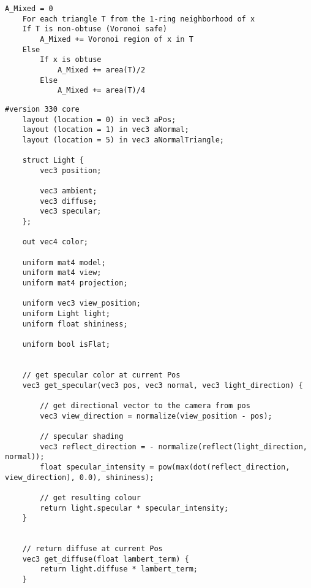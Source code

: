 \vspace{10pt}

\begin{lstlisting}[caption={Region $\mathcal{A}_{Mixed}$ on an arbitrary mesh. \cite{meshlab} (Section: \ref{section:localaveraging})\label{appendix:localaveraging}}]
    A_Mixed = 0
    For each triangle T from the 1-ring neighborhood of x
    If T is non-obtuse (Voronoi safe)
        A_Mixed += Voronoi region of x in T
    Else
        If x is obtuse
            A_Mixed += area(T)/2
        Else
            A_Mixed += area(T)/4
    \end{lstlisting}

\vspace{10pt}

\begin{lstlisting}[caption={Vertex Shader for vertex/triangle flat shading and triangle Gouraud shading using lighting (Section: \ref{section:extend-flat-shading-lighting})\label{appendix:vs-flat-shading-lighting}}]
    #version 330 core
    layout (location = 0) in vec3 aPos;
    layout (location = 1) in vec3 aNormal;
    layout (location = 5) in vec3 aNormalTriangle;

    struct Light {
        vec3 position;

        vec3 ambient;
        vec3 diffuse;
        vec3 specular;
    };

    out vec4 color;

    uniform mat4 model;
    uniform mat4 view;
    uniform mat4 projection;

    uniform vec3 view_position;
    uniform Light light;
    uniform float shininess;

    uniform bool isFlat;


    // get specular color at current Pos
    vec3 get_specular(vec3 pos, vec3 normal, vec3 light_direction) {

        // get directional vector to the camera from pos
        vec3 view_direction = normalize(view_position - pos);

        // specular shading
        vec3 reflect_direction = - normalize(reflect(light_direction, normal));
        float specular_intensity = pow(max(dot(reflect_direction, view_direction), 0.0), shininess);

        // get resulting colour
        return light.specular * specular_intensity;
    }


    // return diffuse at current Pos
    vec3 get_diffuse(float lambert_term) {
        return light.diffuse * lambert_term;
    }


\end{lstlisting}
